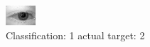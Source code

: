 \begin{figure}[h!]
\begin{center}
\includegraphics[width=0.60\columnwidth]{figures/ID407_class_1_target_2.png}
\end{center}
\caption{ Classification: 1 actual target: 2}
\label{fig:ID407_class_1_target_2}
\end{figure}
